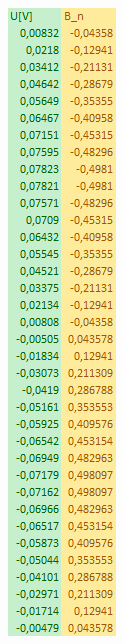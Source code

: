 \documentclass{article}
\begin{document}
\begin{figure}[h!]
    \centering
    \includegraphics[scale=0.5]{pako.png}
\end{figure}{}
\end{document}

